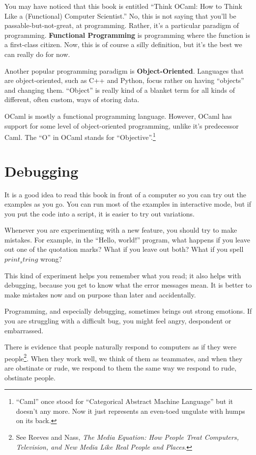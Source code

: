 \documentclass[10pt]{book}
\begin{document}
You may have noticed that this book is entitled ``Think OCaml: How to Think Like a (Functional) Computer Scientist.'' No, this is not saying that you'll be passable-but-not-great, at programming. Rather, it's a particular paradigm of programming. {\bf Functional Programming} is programming where the function is a first-class citizen. Now, this is of course a silly definition, but it's the best we can really do for now.

Another popular programming paradigm is {\bf Object-Oriented}. Languages that are object-oriented, such as C++ and Python, focus rather on having ``objects'' and changing them. ``Object'' is really kind of a blanket term for all kinds of different, often custom, ways of storing data.

OCaml is mostly a functional programming language. However, OCaml has support for some level of object-oriented programming, unlike it's predecessor Caml. The ``O'' in OCaml stands for ``Objective''.\footnote{``Caml'' once stood for ``Categorical Abstract Machine Language'' but it doesn't any more. Now it just represents an even-toed ungulate with humps on its back.}

\section{Debugging}

It is a good idea to read this book in front of a computer so you can try out the examples as you go.  You can run most of the examples in interactive mode, but if you put the code into a script, it is easier to try out variations.

Whenever you are experimenting with a new feature, you should try to make mistakes.  For example, in the ``Hello, world!'' program, what happens if you leave out one of the quotation marks?  What if you leave out both?  What if you spell {\tt $print_string$} wrong?


This kind of experiment helps you remember what you read; it also helps with debugging, because you get to know what the error messages mean. It is better to make mistakes now and on purpose than later and accidentally.

Programming, and especially debugging, sometimes brings out strong emotions.  If you are struggling with a difficult bug, you might feel angry, despondent or embarrassed.

There is evidence that people naturally respond to computers as if they were people\footnote{See Reeves and Nass, {\it The Media Equation: How People Treat Computers, Television, and New Media Like Real People and Places}.}.  When they work well, we think of them as teammates, and when they are obstinate or rude, we respond to them the same way we respond to rude, obstinate people.
\end{document}
